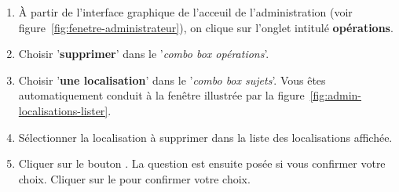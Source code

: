 \begin{enumerate}[1)]
	\item \`A partir de l'interface graphique de l'acceuil de
		l'administration (voir figure~\ref{fig:fenetre-administrateur}),
		on clique sur l'onglet intitul\'e \textbf{op\'erations}. 
		
	\item Choisir '\textbf{supprimer}' dans le '\emph{combo box
		op\'erations}'.
		
	\item Choisir '\textbf{une localisation}' dans le '\emph{combo box
		sujets}'. Vous \^etes automatiquement conduit \`a la fen\^etre
		illustr\'ee par la figure~\ref{fig:admin-localisations-lister}.
		
	\item S\'electionner la localisation \`a supprimer dans la liste
		des localisations affich\'ee.
		
	\item Cliquer sur le bouton . La question
		est ensuite pos\'ee si vous confirmer votre choix.
		Cliquer sur le  pour confirmer votre choix.
\end{enumerate}
